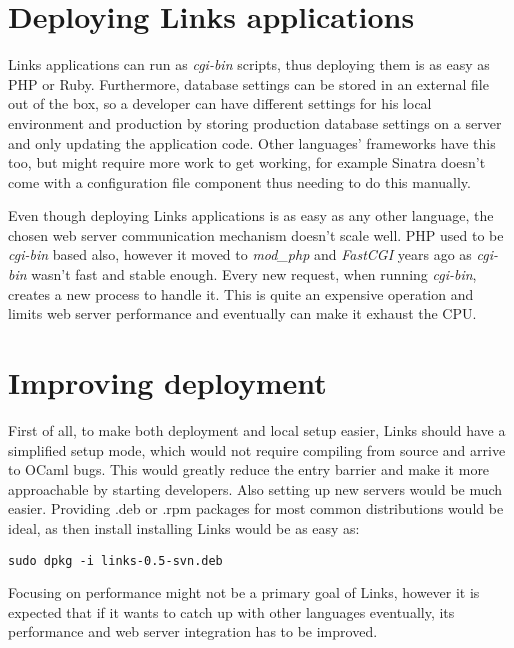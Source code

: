 \section{Deploying Links applications}

Links applications can run as \textit{cgi-bin} scripts, thus deploying them is as easy as PHP or Ruby. Furthermore, database settings can be stored in an external file out of the box, so a developer can have different settings for his local environment and production by storing production database settings on a server and only updating the application code. Other languages' frameworks have this too, but might require more work to get working, for example Sinatra doesn't come with a configuration file component thus needing to do this manually. 

Even though deploying Links applications is as easy as any other language, the chosen web server communication mechanism doesn't scale well. PHP used to be \textit{cgi-bin} based also, however it moved to \textit{mod\_php} and \textit{FastCGI} years ago as \textit{cgi-bin} wasn't fast and stable enough. Every new request, when running \textit{cgi-bin}, creates a new process to handle it. This is quite an expensive operation and limits web server performance and eventually can make it exhaust the CPU. 

\section{Improving deployment}

First of all, to make both deployment and local setup easier, Links should have a simplified setup mode, which would not require compiling from source and arrive to OCaml bugs. This would greatly reduce the entry barrier and make it more approachable by starting developers. Also setting up new servers would be much easier. Providing .deb or .rpm packages for most common distributions would be ideal, as then install installing Links would be as easy as:

\begin{codelisting}
\begin{verbatim}
sudo dpkg -i links-0.5-svn.deb
\end{verbatim}
\end{codelisting}

Focusing on performance might not be a primary goal of Links, however it is expected that if it wants to catch up with other languages eventually, its performance and web server integration has to be improved. 